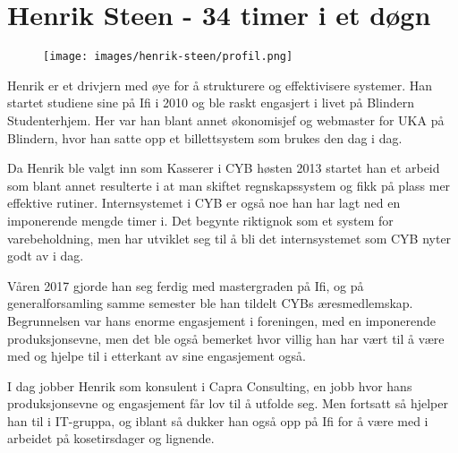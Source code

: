 \chapter[Henrik Steen]{Henrik Steen - 34 timer i et døgn}

\author{Skrevet av Arne Hassel}

\begin{figure}
	\texttt{[image: images/henrik-steen/profil.png]}
	\label{fig:henrik-steen}
\end{figure}

Henrik er et drivjern med øye for å strukturere og effektivisere systemer. Han startet studiene sine på Ifi i 2010 og ble raskt engasjert i livet på Blindern Studenterhjem. Her var han blant annet økonomisjef og webmaster for UKA på Blindern, hvor han satte opp et billettsystem som brukes den dag i dag.

Da Henrik ble valgt inn som Kasserer i CYB høsten 2013 startet han et arbeid som blant annet resulterte i at man skiftet regnskapssystem og fikk på plass mer effektive rutiner. Internsystemet i CYB er også noe han har lagt ned en imponerende mengde timer i. Det begynte riktignok som et system for varebeholdning, men har utviklet seg til å bli det internsystemet som CYB nyter godt av i dag.

Våren 2017 gjorde han seg ferdig med mastergraden på Ifi, og på generalforsamling samme semester ble han tildelt CYBs æresmedlemskap. Begrunnelsen var hans enorme engasjement i foreningen, med en imponerende produksjonsevne, men det ble også bemerket hvor villig han har vært til å være med og hjelpe til i etterkant av sine engasjement også.

I dag jobber Henrik som konsulent i Capra Consulting, en jobb hvor hans produksjonsevne og engasjement får lov til å utfolde seg. Men fortsatt så hjelper han til i IT-gruppa, og iblant så dukker han også opp på Ifi for å være med i arbeidet på kosetirsdager og lignende.
